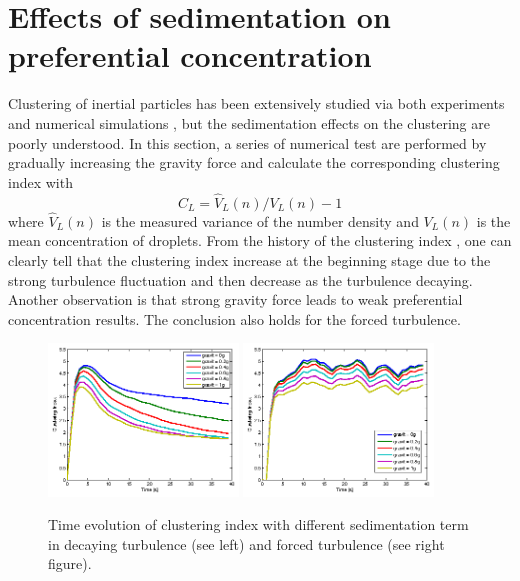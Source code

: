 \documentclass[12pt]{article}
\begin{document}
\section{Effects of sedimentation on preferential concentration }
Clustering of inertial particles has been extensively studied via both 
experiments and numerical simulations \cite{Sundaram97, Reade2000}, but the sedimentation effects on the clustering are poorly understood. In this section, a series of numerical test are performed by gradually increasing the 
gravity force and calculate the corresponding clustering index \cite{Vaillancourt02} with
\begin{equation}
C_L = \hat{V}_L(n)/V_L(n)-1
\label{eq:cluster_index}
\end{equation}
where $\hat{V}_L(n)$ is the measured variance of the number density and $V_L(n)$ is the mean concentration of droplets.
From the history of the clustering index , one can clearly tell that the clustering index increase at the beginning stage due to the strong turbulence fluctuation and then decrease as the turbulence decaying. Another observation is that strong gravity force leads to weak preferential concentration results. The conclusion also holds for the forced turbulence.
\begin{figure}[H]
\includegraphics[width=0.45\textwidth]{Figures/gravity_time_decay}
\includegraphics[width=0.45\textwidth]{Figures/gravity_time_force}
\caption{Time evolution of clustering index with different sedimentation term in decaying turbulence (see left) and 
forced turbulence (see right figure).}
\label{fig:gravity_cluster}
\end{figure}
\end{document}

